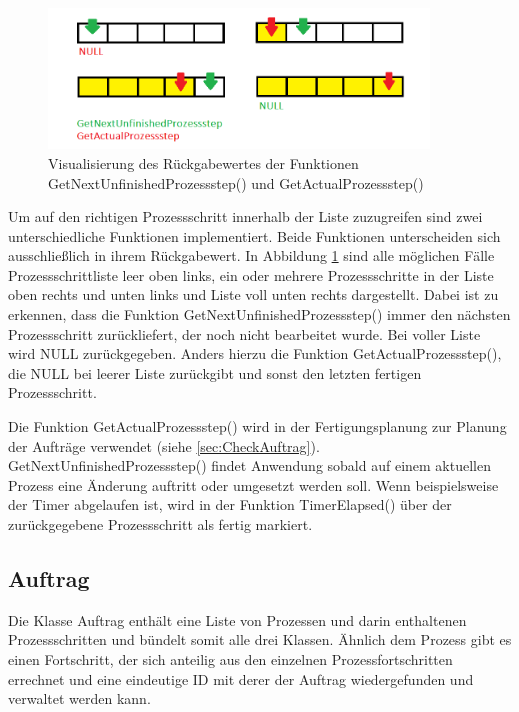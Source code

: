 \begin{figure}[htb]
    \centering
    \includegraphics[width=0.9\textwidth]{Abbildungen/GetProzessstep.PNG}
    \caption{Visualisierung des Rückgabewertes der Funktionen GetNextUnfinishedProzessstep() und GetActualProzessstep()}		
    \label{fig:GetProzessstepFunktionen}
\end{figure}

Um auf den richtigen Prozessschritt innerhalb der Liste zuzugreifen sind zwei unterschiedliche Funktionen implementiert. Beide Funktionen unterscheiden sich ausschließlich in ihrem Rückgabewert. In Abbildung \ref{fig:GetProzessstepFunktionen} sind alle möglichen Fälle Prozessschrittliste leer oben links, ein oder mehrere Prozessschritte in der Liste oben rechts und unten links und Liste voll unten rechts dargestellt. Dabei ist zu erkennen, dass die Funktion GetNextUnfinishedProzessstep() immer den nächsten Prozessschritt zurückliefert, der noch nicht bearbeitet wurde. Bei voller Liste wird NULL zurückgegeben. Anders hierzu die Funktion GetActualProzessstep(), die NULL bei leerer Liste zurückgibt und sonst den letzten fertigen Prozessschritt. 

Die Funktion GetActualProzessstep() wird in der Fertigungsplanung zur Planung der Aufträge verwendet (siehe \ref{sec:CheckAuftrag}). GetNextUnfinishedProzessstep() findet Anwendung sobald auf einem aktuellen Prozess eine Änderung auftritt oder umgesetzt werden soll. Wenn beispielsweise der Timer abgelaufen ist, wird in der Funktion TimerElapsed() über der zurückgegebene Prozessschritt als fertig markiert.

\subsection{Auftrag}
\label{sec:Auftrag}

Die Klasse Auftrag enthält eine Liste von Prozessen und darin enthaltenen Prozessschritten und bündelt somit alle drei Klassen. Ähnlich dem Prozess gibt es einen Fortschritt, der sich anteilig aus den einzelnen Prozessfortschritten errechnet und eine eindeutige ID mit derer der Auftrag wiedergefunden und verwaltet werden kann. 

